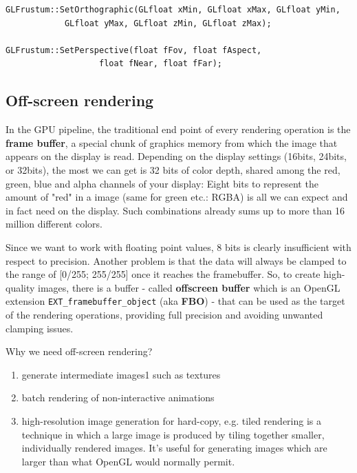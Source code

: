 \begin{verbatim}
GLFrustum::SetOrthographic(GLfloat xMin, GLfloat xMax, GLfloat yMin,
            GLfloat yMax, GLfloat zMin, GLfloat zMax);

GLFrustum::SetPerspective(float fFov, float fAspect, 
                   float fNear, float fFar);
\end{verbatim}


\subsection{Off-screen rendering}
\label{sec:screen-rendering}

In the GPU pipeline, the traditional end point of every rendering
operation is the {\bf frame buffer}, a special chunk of graphics
memory from which the image that appears on the display is
read. Depending on the display settings (16bits, 24bits, or 32bits),
the most we can get is 32 bits of color depth, shared among the red,
green, blue and alpha channels of your display: Eight bits to
represent the amount of "red" in a image (same for green etc.: RGBA)
is all we can expect and in fact need on the display. Such
combinations already sums up to more than 16 million different
colors. 

Since we want to work with floating point values, 8 bits is clearly
insufficient with respect to precision. Another problem is that the
data will always be clamped to the range of [0/255; 255/255] once it
reaches the framebuffer. So, to create high-quality images, there is a
buffer - called {\bf offscreen buffer} which is an OpenGL extension
\verb!EXT_framebuffer_object! (aka {\bf FBO}) - that can be used as
the target of the rendering operations, providing full precision and
avoiding unwanted clamping issues.

\begin{framed}
  Why we need off-screen rendering?
  \begin{enumerate}
  \item generate intermediate images1 such as textures
  \item batch rendering of non-interactive animations
  \item high-resolution image generation for hard-copy, e.g. tiled
    rendering is a technique in which a large image is produced by
    tiling together smaller, individually rendered images. It's useful
    for generating images which are larger than what OpenGL would
    normally permit.
  \end{enumerate}
\end{framed}

